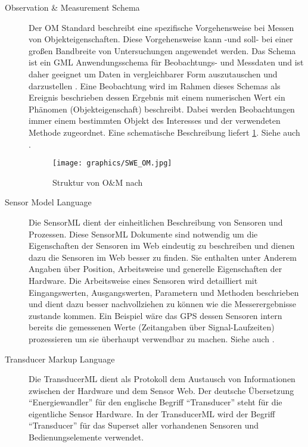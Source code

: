 \begin{description}
\item[Observation \& Measurement Schema] Der \gls{OM} Standard beschreibt eine spezifische Vorgehensweise bei Messen von Objekteigenschaften. Diese Vorgehensweise kann -und soll- bei einer großen Bandbreite von Untersuchungen angewendet werden. Das Schema ist ein \gls{GML} Anwendungsschema für Beobachtungs- und Messdaten und ist daher geeignet um Daten in vergleichbarer Form auszutauschen und darzustellen \citep{kraak_what_2005}. Eine Beobachtung wird im Rahmen dieses Schemas als Ereignis beschrieben dessen Ergebnis mit einem numerischen Wert ein Phänomen (Objekteigenschaft) beschreibt. Dabei werden Beobachtungen immer einem bestimmten Objekt des Interesses und der verwendeten Methode zugeordnet. Eine schematische Beschreibung liefert \ref{fig:swe_om}. Siehe auch \citep{cox_observations_2011}.
\begin{figure}[H]
	\centering
 	 \texttt{[image: graphics/SWE\_OM.jpg]} 
	\caption{Struktur von O\&M nach \citep{ansorge_web_2012}}
	 \label{fig:swe_om}
\end{figure}
\item[Sensor Model Language] Die \gls{SensorML} dient der einheitlichen Beschreibung von Sensoren und Prozessen. Diese \gls{SensorML} Dokumente sind notwendig um die Eigenschaften der Sensoren im Web eindeutig zu beschreiben und dienen dazu die Sensoren im Web besser zu finden. Sie enthalten unter Anderem Angaben über Position, Arbeitsweise und generelle Eigenschaften der Hardware. Die Arbeitsweise eines Sensoren wird detailliert mit Eingangswerten, Ausgangswerten, Parametern und Methoden beschrieben und dient dazu besser nachvollziehen zu können wie die Messerergebnisse zustande kommen. Ein Beispiel wäre das \gls{GPS} dessen Sensoren intern bereits die gemessenen Werte (Zeitangaben über Signal-Laufzeiten) prozessieren um sie überhaupt verwendbar zu machen. Siehe auch \citep{botts_opengis_2007}.
\item[Transducer Markup Language] Die \gls{TransducerML} dient als Protokoll dem Austausch von Informationen zwischen der Hardware und dem Sensor Web. Der deutsche Übersetzung ``Energiewandler'' für den englische Begriff ``Transducer'' steht für die eigentliche Sensor Hardware. In der \gls{TransducerML} wird der Begriff ``Transducer'' für das Superset aller vorhandenen Sensoren und Bedienungselemente verwendet. 

\end{description}
